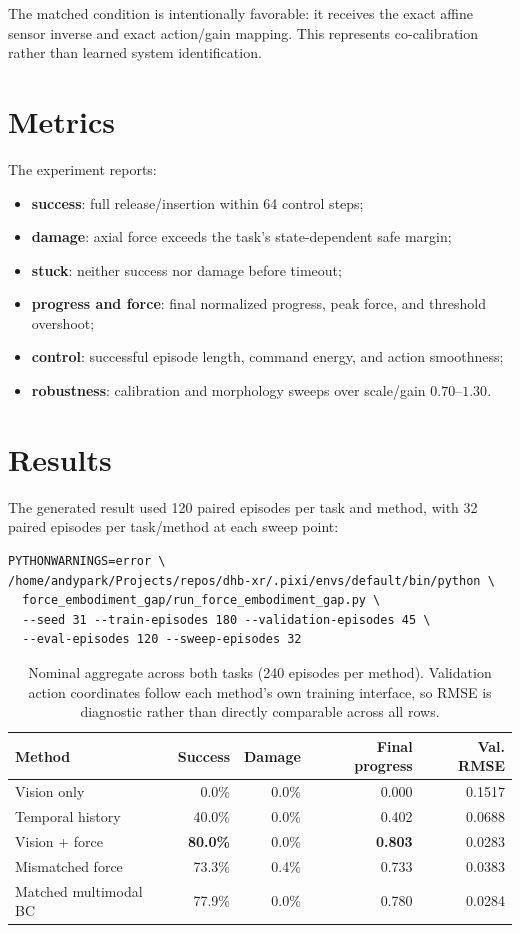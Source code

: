 \documentclass[11pt]{article}
\begin{document}
The matched condition is intentionally favorable: it receives the exact affine sensor inverse and exact action/gain mapping. This represents co-calibration rather than learned system identification.

\section{Metrics}

The experiment reports:
\begin{itemize}[leftmargin=1.5em]
  \item \textbf{success}: full release/insertion within 64 control steps;
  \item \textbf{damage}: axial force exceeds the task's state-dependent safe margin;
  \item \textbf{stuck}: neither success nor damage before timeout;
  \item \textbf{progress and force}: final normalized progress, peak force, and threshold overshoot;
  \item \textbf{control}: successful episode length, command energy, and action smoothness;
  \item \textbf{robustness}: calibration and morphology sweeps over scale/gain $0.70$--$1.30$.
\end{itemize}

\section{Results}

The generated result used 120 paired episodes per task and method, with 32 paired episodes per task/method at each sweep point:
\begin{verbatim}
PYTHONWARNINGS=error \
/home/andypark/Projects/repos/dhb-xr/.pixi/envs/default/bin/python \
  force_embodiment_gap/run_force_embodiment_gap.py \
  --seed 31 --train-episodes 180 --validation-episodes 45 \
  --eval-episodes 120 --sweep-episodes 32
\end{verbatim}

\begin{table}[H]
\centering
\begin{tabular}{lrrrr}
\toprule
Method & Success & Damage & Final progress & Val. RMSE \\
\midrule
Vision only & 0.0\% & 0.0\% & 0.000 & 0.1517 \\
Temporal history & 40.0\% & 0.0\% & 0.402 & 0.0688 \\
Vision + force & \textbf{80.0\%} & 0.0\% & \textbf{0.803} & 0.0283 \\
Mismatched force & 73.3\% & 0.4\% & 0.733 & 0.0383 \\
Matched multimodal BC & 77.9\% & 0.0\% & 0.780 & 0.0284 \\
\bottomrule
\end{tabular}
\caption{Nominal aggregate across both tasks (240 episodes per method). Validation action coordinates follow each method's own training interface, so RMSE is diagnostic rather than directly comparable across all rows.}
\label{tab:results}
\end{table}
\end{document}

